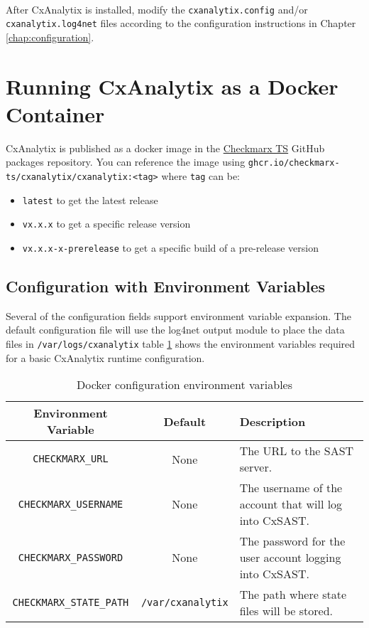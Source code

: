 \noindent\\After CxAnalytix is installed, modify the \texttt{cxanalytix.config} and/or \texttt{cxanalytix.log4net} files according to the 
configuration instructions in Chapter \ref{chap:configuration}.

\section{Running CxAnalytix as a Docker Container}

CxAnalytix is published as a docker image in the \href{https://github.com/checkmarx-ts/CxAnalytix/pkgs/container/cxanalytix%2Fcxanalytix}{Checkmarx TS} GitHub 
packages repository. You can reference the image using \verb|ghcr.io/checkmarx-ts/cxanalytix/cxanalytix:<tag>| where \verb|tag| can be:

\begin{itemize}
    \item \verb|latest| to get the latest release
    \item \verb|vx.x.x| to get a specific release version
    \item \verb|vx.x.x-x-prerelease| to get a specific build of a pre-release version
\end{itemize}

\subsection{Configuration with Environment Variables}

Several of the configuration fields support environment variable expansion.  The default configuration file will use the log4net output
module to place the data files in \verb|/var/logs/cxanalytix| table \ref{tab:env} shows the environment variables required for a 
basic CxAnalytix runtime configuration.

\begin{table}
    \centering
    \begin{tabular}{|c|c|l|}
        \toprule
        \textbf{Environment Variable} & \textbf{Default} & \textbf{Description}\\
        \midrule
        \verb|CHECKMARX_URL| & None & The URL to the SAST server.\\
        \midrule
        \verb|CHECKMARX_USERNAME| & None & The username of the account that will log into CxSAST.\\
        \midrule
        \verb|CHECKMARX_PASSWORD| & None & The password for the user account logging into CxSAST.\\
        \midrule
        \verb|CHECKMARX_STATE_PATH| & \verb|/var/cxanalytix| & The path where state files will be stored.\\
        \bottomrule
    \end{tabular}
    \caption{Docker configuration environment variables}
    \label{tab:env}
\end{table}

